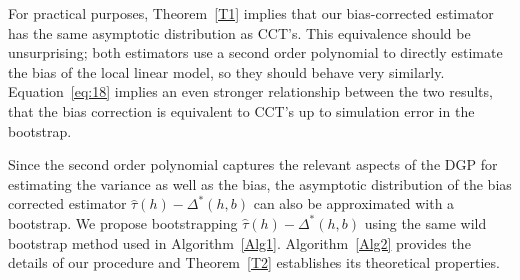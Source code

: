 \documentclass[12pt,fleqn]{article}
\begin{document}
For practical purposes, Theorem~\ref{T1} implies that our bias-corrected
estimator has the same asymptotic distribution as CCT's. This equivalence should
be unsurprising; both estimators use a second order polynomial to directly estimate
the bias of the local linear model, so they should behave very similarly.
Equation~\eqref{eq:18} implies an even stronger relationship between the two
results, that the bias correction is equivalent to CCT's up to simulation error
in the bootstrap.

Since the second order polynomial captures the relevant aspects of the DGP for
estimating the variance as well as the bias, the asymptotic distribution of the
bias corrected estimator $\hat\tau(h) - \Delta^*(h,b)$ can also be approximated
with a bootstrap. We propose bootstrapping $\hat\tau(h) - \Delta^*(h,b)$ using
the same wild bootstrap method used in Algorithm~\ref{Alg1}. Algorithm~\ref{Alg2} provides the details of our procedure
and Theorem~\ref{T2} establishes its theoretical properties.
\end{document}
